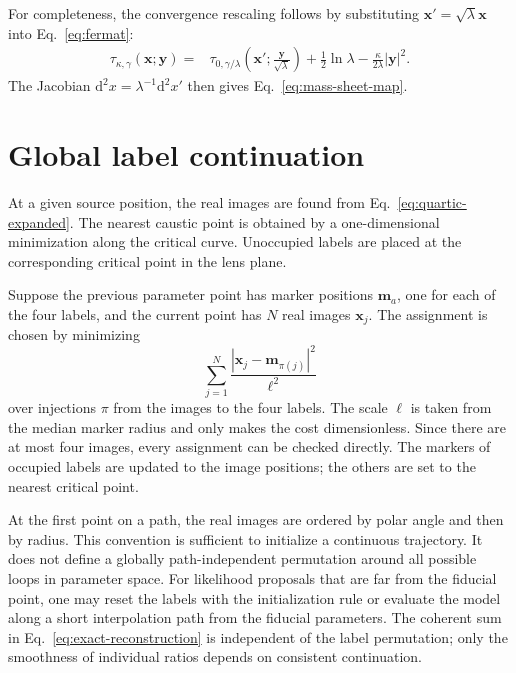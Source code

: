 \documentclass[aps,prd,twocolumn,nofootinbib,superscriptaddress,floatfix]{revtex4-2}
\newcommand{\dd}{\mathrm{d}}
\newcommand{\bx}{\bm{x}}
\newcommand{\by}{\bm{y}}
\begin{document}
For completeness, the convergence rescaling follows by substituting
$\bx'=\sqrt{\lambda}\bx$ into Eq.~\eqref{eq:fermat}:
\begin{align}
 \tau_{\kappa,\gamma}(\bx;\by)={}&
 \tau_{0,\gamma/\lambda}
 \left(\bx';\frac{\by}{\sqrt\lambda}\right)
 +\frac12\ln\lambda
 -\frac{\kappa}{2\lambda}|\by|^2.
\end{align}
The Jacobian $\dd^2x=\lambda^{-1}\dd^2x'$ then gives
Eq.~\eqref{eq:mass-sheet-map}.

\section{Global label continuation}
\label{app:tracking}

At a given source position, the real images are found from
Eq.~\eqref{eq:quartic-expanded}.  The nearest caustic point is obtained by a
one-dimensional minimization along the critical curve.  Unoccupied labels are
placed at the corresponding critical point in the lens plane.

Suppose the previous parameter point has marker positions $\bm m_a$, one for
each of the four labels, and the current point has $N$ real images
$\bx_j$.  The assignment is chosen by minimizing
\begin{equation}
 \sum_{j=1}^{N}\frac{|\bx_j-\bm m_{\pi(j)}|^2}{\ell^2}
 \label{eq:assignment-cost}
\end{equation}
over injections $\pi$ from the images to the four labels.  The scale $\ell$ is
taken from the median marker radius and only makes the cost dimensionless.
Since there are at most four images, every assignment can be checked directly.
The markers of occupied labels are updated to the image positions; the others
are set to the nearest critical point.

At the first point on a path, the real images are ordered by polar angle and
then by radius.  This convention is sufficient to initialize a continuous
trajectory.  It does not define a globally path-independent permutation around
all possible loops in parameter space.  For likelihood proposals that are far
from the fiducial point, one may reset the labels with the initialization rule
or evaluate the model along a short interpolation path from the fiducial
parameters.  The coherent sum in Eq.~\eqref{eq:exact-reconstruction} is
independent of the label permutation; only the smoothness of individual ratios
depends on consistent continuation.



\end{document}

